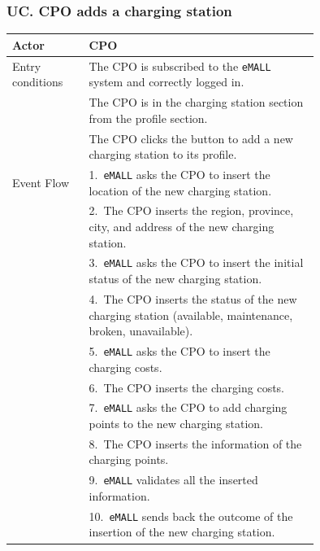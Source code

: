 \subsubsection*{UC\cuc . CPO adds a charging station}
\begin{center}
    \begin{longtable}{lp{0.75\linewidth}}
        \hline
        Actor            & CPO                                                                                                       \\
        \hline
        Entry conditions & The CPO is subscribed to the \verb|eMALL| system and correctly logged in.                                        \\
        & The CPO is in the charging station section from the profile section.                                      \\
        & The CPO clicks the button to add a new charging station to its profile.                                   \\
        \hline
        Event Flow       & 1.\ \verb|eMALL| asks the CPO to insert the location of the new charging station.                                \\
        & 2.\ The CPO inserts the region, province, city, and address of the new charging station.                  \\
        & 3.\ \verb|eMALL| asks the CPO to insert the initial status of the new charging station.                          \\
        & 4.\ The CPO inserts the status of the new charging station (available, maintenance, broken, unavailable). \\
        & 5.\ \verb|eMALL| asks the CPO to insert the charging costs.                                                      \\
        & 6.\ The CPO inserts the charging costs.                                                                   \\
        & 7.\ \verb|eMALL| asks the CPO to add charging points to the new charging station.                                \\
        & 8.\ The CPO inserts the information of the charging points.                                               \\
        & 9.\ \verb|eMALL| validates all the inserted information.                                                         \\
        & 10.\ \verb|eMALL| sends back the outcome of the insertion of the new charging station.                           \\

\end{longtable}
\end{center}
